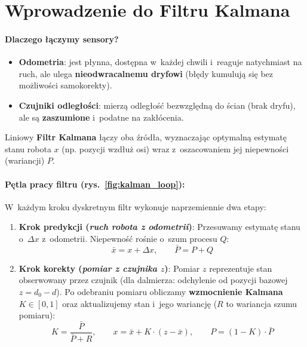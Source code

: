 \documentclass[10pt,a4paper]{article}
\begin{document}
\clearpage

\section{Wprowadzenie do Filtru Kalmana}

\paragraph{Dlaczego łączymy sensory?}
\begin{itemize}[itemsep=4pt, topsep=3pt]
    \item \textbf{Odometria}: jest płynna, dostępna w~każdej chwili i~reaguje natychmiast na ruch, ale ulega \textbf{nieodwracalnemu dryfowi} (błędy kumulują się bez możliwości samokorekty).
    \item \textbf{Czujniki odległości}: mierzą odległość bezwzględną do ścian (brak dryfu), ale są \textbf{zaszumione} i~podatne na zakłócenia.
\end{itemize}
Liniowy \textbf{Filtr Kalmana} łączy oba źródła, wyznaczając optymalną estymatę stanu robota $x$ (np. pozycji wzdłuż osi) wraz z~oszacowaniem jej niepewności (wariancji) $P$.

\paragraph{Pętla pracy filtru (rys.~\ref{fig:kalman_loop}):}
W~każdym kroku dyskretnym filtr wykonuje naprzemiennie dwa etapy:
\begin{enumerate}[itemsep=4pt, topsep=3pt]
    \item \textbf{Krok predykcji (\emph{ruch robota z odometrii})}:
    Przesuwamy estymatę stanu o~$\Delta x$ z~odometrii. Niepewność rośnie o~szum procesu $Q$:
    \begin{equation*}
        \bar{x} = x + \Delta x, \qquad \bar{P} = P + Q
    \end{equation*}
    \item \textbf{Krok korekty (\emph{pomiar z czujnika $z$})}:
    Pomiar $z$ reprezentuje stan obserwowany przez czujnik (dla dalmierza: odchylenie od pozycji bazowej $z = d_0 - d$). Po odebraniu pomiaru obliczamy \textbf{wzmocnienie Kalmana} $K \in [0, 1]$ oraz aktualizujemy stan i~jego wariancję ($R$ to wariancja szumu pomiaru):
    \begin{equation*}
        K = \frac{\bar{P}}{\bar{P} + R}, \qquad x = \bar{x} + K \cdot (z - \bar{x}), \qquad P = (1 - K) \cdot \bar{P}
    \end{equation*}
\end{enumerate}
\end{document}

